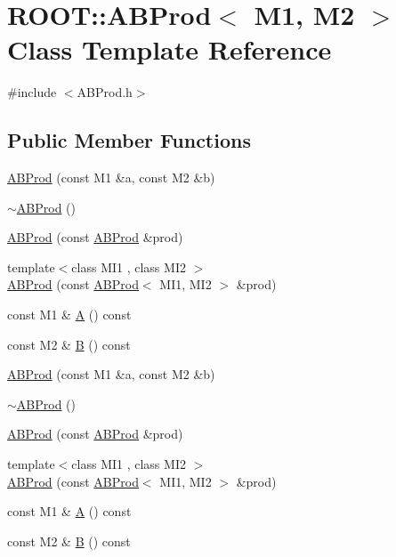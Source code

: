 \hypertarget{classROOT_1_1Minuit2_1_1ABProd}{}\section{R\+O\+OT\+:\+:A\+B\+Prod$<$ M1, M2 $>$ Class Template Reference}
\label{classROOT_1_1Minuit2_1_1ABProd}


{\ttfamily \#include $<$A\+B\+Prod.\+h$>$}

\subsection*{Public Member Functions}
\begin{DoxyCompactItemize}
\item 
\mbox{\hyperlink{classROOT_1_1Minuit2_1_1ABProd_aee50cf5b18a146adca10f08b5475ec9b}{A\+B\+Prod}} (const M1 \&a, const M2 \&b)
\item 
\mbox{\hyperlink{classROOT_1_1Minuit2_1_1ABProd_acf17bb5e9c597f836bf033c8a56c1195}{$\sim$\+A\+B\+Prod}} ()
\item 
\mbox{\hyperlink{classROOT_1_1Minuit2_1_1ABProd_a7e68f6f5154087b32415717962556992}{A\+B\+Prod}} (const \mbox{\hyperlink{classROOT_1_1Minuit2_1_1ABProd}{A\+B\+Prod}} \&prod)
\item 
{\footnotesize template$<$class M\+I1 , class M\+I2 $>$ }\\\mbox{\hyperlink{classROOT_1_1Minuit2_1_1ABProd_a792de1723360074762c646a30e7889f3}{A\+B\+Prod}} (const \mbox{\hyperlink{classROOT_1_1Minuit2_1_1ABProd}{A\+B\+Prod}}$<$ M\+I1, M\+I2 $>$ \&prod)
\item 
const M1 \& \mbox{\hyperlink{classROOT_1_1Minuit2_1_1ABProd_a14f6ecd4f0a72010d6c2a8e7f2916cfa}{A}} () const
\item 
const M2 \& \mbox{\hyperlink{classROOT_1_1Minuit2_1_1ABProd_a526658028b2971b0dbf6f1b78b05d6a7}{B}} () const
\item 
\mbox{\hyperlink{classROOT_1_1Minuit2_1_1ABProd_aee50cf5b18a146adca10f08b5475ec9b}{A\+B\+Prod}} (const M1 \&a, const M2 \&b)
\item 
\mbox{\hyperlink{classROOT_1_1Minuit2_1_1ABProd_acf17bb5e9c597f836bf033c8a56c1195}{$\sim$\+A\+B\+Prod}} ()
\item 
\mbox{\hyperlink{classROOT_1_1Minuit2_1_1ABProd_a7e68f6f5154087b32415717962556992}{A\+B\+Prod}} (const \mbox{\hyperlink{classROOT_1_1Minuit2_1_1ABProd}{A\+B\+Prod}} \&prod)
\item 
{\footnotesize template$<$class M\+I1 , class M\+I2 $>$ }\\\mbox{\hyperlink{classROOT_1_1Minuit2_1_1ABProd_a792de1723360074762c646a30e7889f3}{A\+B\+Prod}} (const \mbox{\hyperlink{classROOT_1_1Minuit2_1_1ABProd}{A\+B\+Prod}}$<$ M\+I1, M\+I2 $>$ \&prod)
\item 
const M1 \& \mbox{\hyperlink{classROOT_1_1Minuit2_1_1ABProd_a14f6ecd4f0a72010d6c2a8e7f2916cfa}{A}} () const
\item 
const M2 \& \mbox{\hyperlink{classROOT_1_1Minuit2_1_1ABProd_a526658028b2971b0dbf6f1b78b05d6a7}{B}} () const
\end{DoxyCompactItemize}


